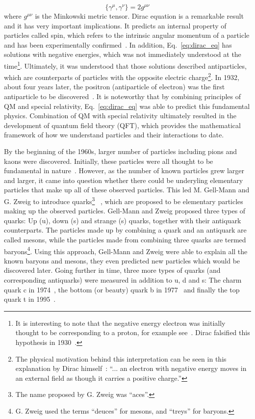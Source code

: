 \begin{equation}
    \{\gamma^{\mu}, \gamma^{\nu} \} = 2g^{\mu\nu}
    \label{eq:gamma_matrices_anticomm}
\end{equation}
where $g^{\mu\nu}$ is the Minkowski metric tensor.
Dirac equation is a remarkable result and it has very important implications.
It predicts an internal property of particles called spin, 
which refers to the intrinsic angular momentum of a particle and has been
experimentally confirmed~\cite{Dirac:1928hu}. In addition, Eq.~\ref{eq:dirac_eq} has solutions with negative
energies, which was not immediately understood at the time\footnote{It is interesting to note
that the negative energy electron was initially thought to be corresponding to a proton,
for example see~\cite{Weyl:1929fm}. Dirac falsified this hypothesis
in 1930~\cite{Dirac:1930ek}.}. 
Ultimately, it was understood that those solutions described
antiparticles, which are counterparts of particles with the opposite electric 
charge\footnote{The physical motivation behind this interpretation can be seen 
in this explanation by Dirac himself~\cite{Dirac:1930ek}: 
``... an electron with negative energy moves in an external
field as though it carries a positive charge.''}. 
In 1932, about four years later, the positron (antiparticle of electron) 
was the first antiparticle to be discovered~\cite{Anderson:1932zz}. 
It is noteworthy that by combining principles of QM and special relativity,
Eq.~\ref{eq:dirac_eq} was able to predict this fundamental physics.
Combination of QM with special relativity ultimately resulted in the development of 
quantum field theory (QFT), which provides the mathematical framework 
of how we understand particles and their interactions to date.

By the beginning of the 1960s, larger number of particles including
pions and kaons were discovered. Initially, these particles were all thought to 
be fundamental in nature~\cite{Riordan:1992hr}. 
However, as the number of known particles grew larger and larger, it came into 
question whether there could be
underyling elementary particles that make up all of these observed particles. This led 
M. Gell-Mann and G. Zweig to introduce 
quarks\footnote{The name proposed by G. Zweig was ``aces''.}
~\cite{Gell-Mann:1964ewy}, which are proposed to
be elementary particles making up the observed particles. Gell-Mann and Zweig proposed 
three types of quarks:
Up (u), down (s) and strange (s) quarks, together with their antiquark counterparts.
The particles made up by combining a quark and an antiquark are called mesons, while the particles made
from combining three quarks are termed 
baryons\footnote{G. Zweig used the terms ``deuces'' for mesons, and ``treys'' for baryons.}. 
Using this approach, Gell-Mann and Zweig were able to
explain all the known baryons and mesons, they even predicted new particles which would be discovered 
later\cite{Riordan:1992hr}. Going further in time, three more types of quarks (and corresponding 
antiquarks) were measured in addition to u, d and s: The charm quark c in 1974~\cite{E598:1974sol}, the
bottom (or beauty) quark b in 1977~\cite{E288:1977xhf} and finally the top quark t in 1995~\cite{D0:1995jca}.

